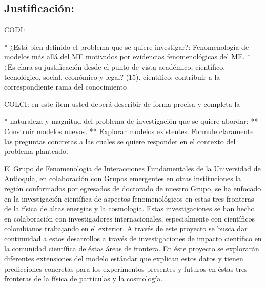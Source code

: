 \subsection{Justificación:                                 }
\begin{instrucciones}
  CODI: 

  * ¿Está bien definido el problema que se quiere investigar?:
  Fenomenología de modelos más allá del ME motivados por evidencias
  fenomenológicas del ME.  
  * ¿Es clara su justificación desde el punto de vista académico,
  científico, tecnológico, social, económico y legal? (15).
  científico: contribuir a la correspondiente rama del conocimiento

  COLCI: en este ítem usted deberá describir de forma precisa y completa la
  
  * naturaleza y magnitud del problema de investigación que se quiere
  abordar:
  ** Construir modelos nuevos.
  ** Explorar modelos existentes.
  Formule claramente las preguntas concretas a las cuales se
  quiere responder en el contexto del problema planteado.
\end{instrucciones}
El Grupo de Fenomenología de Interacciones Fundamentales de la
Universidad de Antioquia, en colaboración con Grupos emergentes en
otras instituciones la región conformados por egresados de doctorado
de nuestro Grupo, se ha enfocado en la investigación científica de
aspectos fenomenológicos en estas tres fronteras de la física de altas
energías y la cosmología. Estas investigaciones se han hecho en
colaboración con investigadores internacionales, especialmente con
científicos colombianos trabajando en el exterior. A través de este
proyecto se busca dar continuidad a estos desarrollos a través de
investigaciones de impacto científico en la comunidad científica de
éstas áreas de frontera. En éste proyecto se explorarán diferentes
extensiones del modelo estándar que explican estos datos y tienen
predicciones concretas para los experimentos presentes y futuros en
éstas tres fronteras de la física de partículas y la cosmología.


